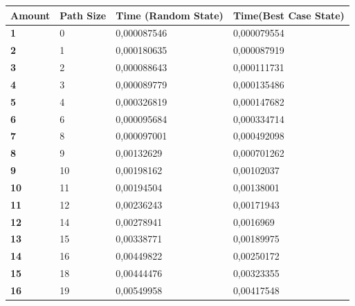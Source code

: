 \documentclass[a4paper]{article}
\begin{document}
\begin{table}[H]
\centering
\label{stack-table}
\begin{tabular}{|l|l|l|l|}
\hline
\textbf{Amount} & \textbf{Path Size} & \textbf{Time (Random State)} & \textbf{Time(Best Case State)} \\ \hline
\textbf{1}      & 0                  & 0,000087546                  & 0,000079554                    \\ \hline
\textbf{2}      & 1                  & 0,000180635                  & 0,000087919                    \\ \hline
\textbf{3}      & 2                  & 0,000088643                  & 0,000111731                    \\ \hline
\textbf{4}      & 3                  & 0,000089779                  & 0,000135486                    \\ \hline
\textbf{5}      & 4                  & 0,000326819                  & 0,000147682                    \\ \hline
\textbf{6}      & 6                  & 0,000095684                  & 0,000334714                    \\ \hline
\textbf{7}      & 8                  & 0,000097001                  & 0,000492098                    \\ \hline
\textbf{8}      & 9                  & 0,00132629                   & 0,000701262                    \\ \hline
\textbf{9}      & 10                 & 0,00198162                   & 0,00102037                     \\ \hline
\textbf{10}     & 11                 & 0,00194504                   & 0,00138001                     \\ \hline
\textbf{11}     & 12                 & 0,00236243                   & 0,00171943                     \\ \hline
\textbf{12}     & 14                 & 0,00278941                   & 0,0016969                      \\ \hline
\textbf{13}     & 15                 & 0,00338771                   & 0,00189975                     \\ \hline
\textbf{14}     & 16                 & 0,00449822                   & 0,00250172                     \\ \hline
\textbf{15}     & 18                 & 0,00444476                   & 0,00323355                     \\ \hline
\textbf{16}     & 19                 & 0,00549958                   & 0,00417548                     \\ \hline

\end{tabular}
\end{table}
\end{document}
